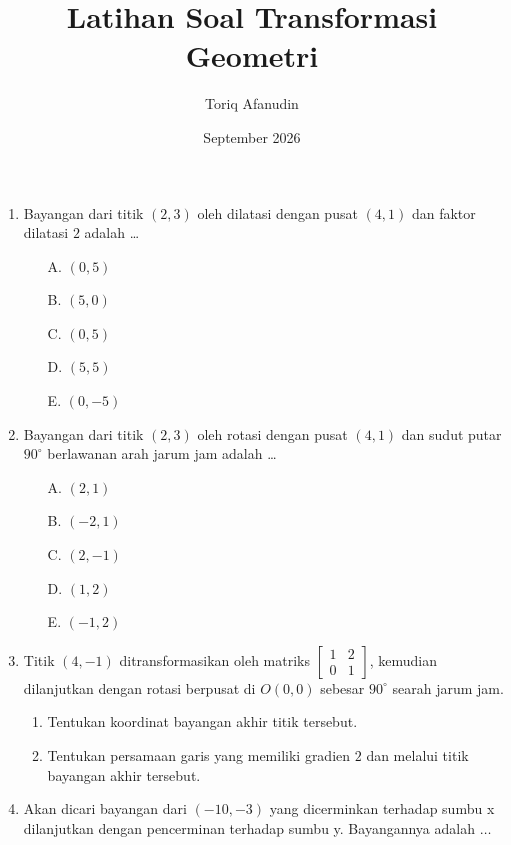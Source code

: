 \documentclass{article}
\title{\textbf{Latihan Soal Transformasi Geometri}}
\author{Toriq Afanudin}
\date{September 2026}
\begin{document}
\maketitle

\begin{enumerate}

    \item Bayangan dari titik $(2,3)$ oleh dilatasi dengan pusat $(4,1)$ dan faktor dilatasi $2$ adalah \dots

    \begin{enumerate}
        \item[A.] $(0,5)$
        \item[B.] $(5,0)$
        \item[C.] $(0,5)$
        \item[D.] $(5,5)$
        \item[E.] $(0,-5)$
    \end{enumerate}

    \item Bayangan dari titik $(2,3)$ oleh rotasi dengan pusat $(4,1)$ dan sudut putar $90^\circ$ berlawanan arah jarum jam adalah \dots

    \begin{enumerate}
        \item[A.] $(2,1)$
        \item[B.] $(-2,1)$
        \item[C.] $(2,-1)$
        \item[D.] $(1,2)$
        \item[E.] $(-1,2)$
    \end{enumerate}

    \item Titik $(4,-1)$ ditransformasikan oleh matriks
    $
        \begin{bmatrix}
            1 & 2 \\
            0 & 1
        \end{bmatrix}
    $,
    kemudian dilanjutkan dengan rotasi berpusat di $O(0,0)$ sebesar $90^\circ$ searah jarum jam.

    \begin{enumerate}
        \item Tentukan koordinat bayangan akhir titik tersebut.
        
        \item Tentukan persamaan garis yang memiliki gradien $2$ dan melalui titik bayangan akhir tersebut.
    \end{enumerate}
    \item Akan dicari bayangan dari $(-10,-3)$ yang dicerminkan terhadap sumbu x dilanjutkan dengan pencerminan terhadap sumbu y. Bayangannya adalah $\dots$


\end{enumerate}
\end{document}
